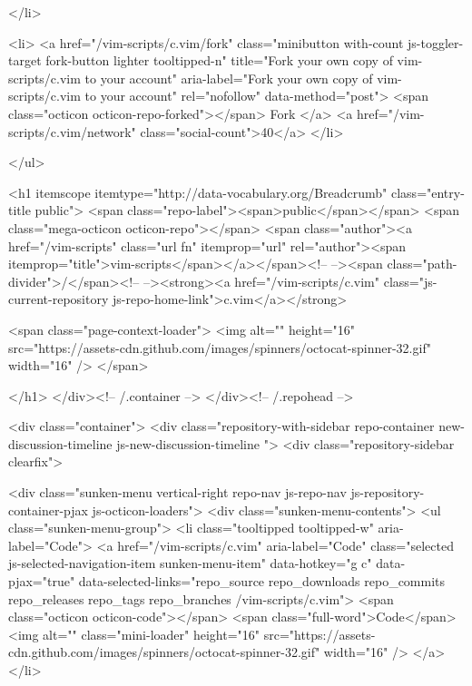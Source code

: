   </li>


        <li>
          <a href="/vim-scripts/c.vim/fork" class="minibutton with-count js-toggler-target fork-button lighter tooltipped-n" title="Fork your own copy of vim-scripts/c.vim to your account" aria-label="Fork your own copy of vim-scripts/c.vim to your account" rel="nofollow" data-method="post">
            <span class="octicon octicon-repo-forked"></span>
            Fork
          </a>
          <a href="/vim-scripts/c.vim/network" class="social-count">40</a>
        </li>

</ul>

        <h1 itemscope itemtype="http://data-vocabulary.org/Breadcrumb" class="entry-title public">
          <span class="repo-label"><span>public</span></span>
          <span class="mega-octicon octicon-repo"></span>
          <span class="author"><a href="/vim-scripts" class="url fn" itemprop="url" rel="author"><span itemprop="title">vim-scripts</span></a></span><!--
       --><span class="path-divider">/</span><!--
       --><strong><a href="/vim-scripts/c.vim" class="js-current-repository js-repo-home-link">c.vim</a></strong>

          <span class="page-context-loader">
            <img alt="" height="16" src="https://assets-cdn.github.com/images/spinners/octocat-spinner-32.gif" width="16" />
          </span>

        </h1>
      </div><!-- /.container -->
    </div><!-- /.repohead -->

    <div class="container">
      <div class="repository-with-sidebar repo-container new-discussion-timeline js-new-discussion-timeline  ">
        <div class="repository-sidebar clearfix">
            

<div class="sunken-menu vertical-right repo-nav js-repo-nav js-repository-container-pjax js-octicon-loaders">
  <div class="sunken-menu-contents">
    <ul class="sunken-menu-group">
      <li class="tooltipped tooltipped-w" aria-label="Code">
        <a href="/vim-scripts/c.vim" aria-label="Code" class="selected js-selected-navigation-item sunken-menu-item" data-hotkey="g c" data-pjax="true" data-selected-links="repo_source repo_downloads repo_commits repo_releases repo_tags repo_branches /vim-scripts/c.vim">
          <span class="octicon octicon-code"></span> <span class="full-word">Code</span>
          <img alt="" class="mini-loader" height="16" src="https://assets-cdn.github.com/images/spinners/octocat-spinner-32.gif" width="16" />
</a>      </li>


